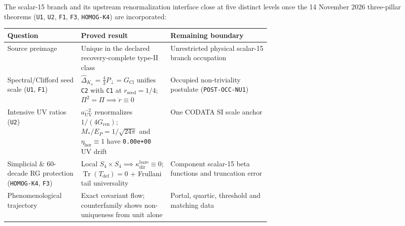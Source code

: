 The scalar-15 branch and its upstream renormalization interface close at five distinct levels once the 14 November 2026 three-pillar theorems (\texttt{U1}, \texttt{U2}, \texttt{F1}, \texttt{F3}, \texttt{HOMOG-K4}) are incorporated:
\begin{center}\small
\begin{tabularx}{0.96\linewidth}{@{}p{0.28\linewidth}p{0.34\linewidth}X@{}}
\toprule
Question & Proved result & Remaining boundary\\
\midrule
Source preimage & Unique in the declared recovery-complete type-II class &
Unrestricted physical scalar-15 branch occupation\\
Spectral/Clifford seed scale (\texttt{U1}, \texttt{F1}) & $\widehat{\Delta}_{K_4}=\frac{4}{3}P_\perp=G_{\mathrm{Cl}}$ unifies \texttt{C2} with \texttt{C1} at $r_{\mathrm{seed}}=1/4$; $\Pi^2=\Pi\implies\dot{r}\equiv 0$ &
Occupied non-triviality postulate (\texttt{POST-OCC-NU1})\\
Intensive UV ratios (\texttt{U2}) & $a_{\mathrm{UV}}^{-2}$ renormalizes $1/(4G_{\mathrm{ren}})$; $M_*/E_P=1/\sqrt{24\pi}$ and $\eta_{\mathrm{hor}}\equiv 1$ have \texttt{0.00e+00} UV drift &
One CODATA SI scale anchor\\
Simplicial \& 60-decade RG protection (\texttt{HOMOG-K4}, \texttt{F3}) & Local $S_4\times S_4\implies\kappa_{\mathrm{dir}}^{\mathrm{bare}}\equiv 0$; $\operatorname{Tr}(T_{\mathrm{def}})=0$ + Frullani tail universality &
Component scalar-15 beta functions and truncation error\\
Phenomenological trajectory & Exact covariant flow; counterfamily shows non-uniqueness from unit alone &
Portal, quartic, threshold and matching data\\
\bottomrule
\end{tabularx}
\end{center}

